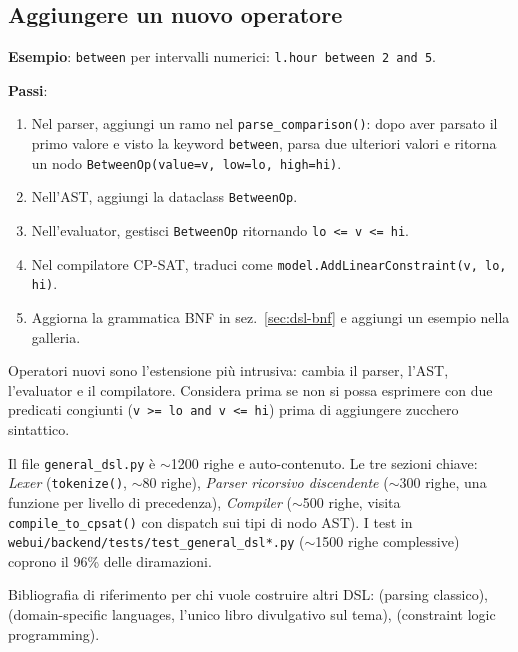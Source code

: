 \subsection{Aggiungere un nuovo operatore}

\textbf{Esempio}: \texttt{between} per intervalli numerici:
\texttt{l.hour between 2 and 5}.

\textbf{Passi}:
\begin{enumerate}
\item Nel parser, aggiungi un ramo nel
  \texttt{parse\_comparison()}: dopo aver parsato il primo
  valore e visto la keyword \texttt{between}, parsa due
  ulteriori valori e ritorna un nodo
  \texttt{BetweenOp(value=v, low=lo, high=hi)}.
\item Nell'AST, aggiungi la dataclass \texttt{BetweenOp}.
\item Nell'evaluator, gestisci \texttt{BetweenOp} ritornando
  \texttt{lo <= v <= hi}.
\item Nel compilatore CP-SAT, traduci come
  \texttt{model.AddLinearConstraint(v, lo, hi)}.
\item Aggiorna la grammatica BNF in sez.~\ref{sec:dsl-bnf}
  e aggiungi un esempio nella galleria.
\end{enumerate}

Operatori nuovi sono l'estensione pi\`u intrusiva: cambia il
parser, l'AST, l'evaluator e il compilatore. Considera prima
se non si possa esprimere con due predicati congiunti
(\texttt{v >= lo and v <= hi}) prima di aggiungere zucchero
sintattico.

\fleuron

\begin{biblioparvabox}[title={Per chi vuole davvero capire il parser}]
\sffamily
Il file \texttt{general\_dsl.py} \`e $\sim$1200 righe e
auto-contenuto. Le tre sezioni chiave: \emph{Lexer}
(\texttt{tokenize()}, $\sim$80 righe), \emph{Parser ricorsivo
discendente} ($\sim$300 righe, una funzione per livello di
precedenza), \emph{Compiler} ($\sim$500 righe, visita
\texttt{compile\_to\_cpsat()} con dispatch sui tipi di nodo
AST). I test in
\texttt{webui/backend/tests/test\_general\_dsl*.py}
($\sim$1500 righe complessive) coprono il 96\% delle
diramazioni.

Bibliografia di riferimento per chi vuole costruire altri
DSL: \cite{aho2006} (parsing classico), \cite{fowler2010}
(domain-specific languages, l'unico libro divulgativo sul
tema), \cite{marriott1998} (constraint logic programming).
\end{biblioparvabox}

